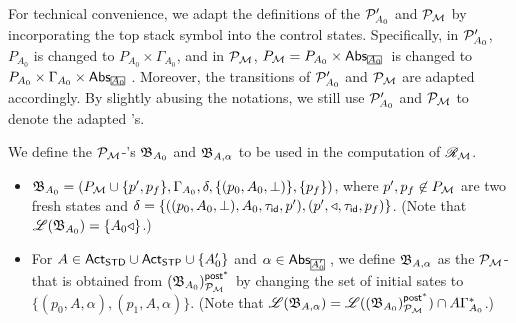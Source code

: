 For technical convenience, we adapt the definitions of the {\WOTrPDS} ${\mathcal{P} }'_{A_0}$ and ${\mathcal{P} }_{\mathcal{M} }$ by incorporating the top stack symbol into the control states. Specifically, in ${\mathcal{P} }'_{A_0}$, $P_{A_0}$ is changed to $P_{A_0} \times \Gamma_{A_0}$, and in ${\mathcal{P} }_{\mathcal{M} }$, $P_\Mm = P_{A_0} \times \abs_{\mhcancel{A_0}}$ is changed to $P_{A_0} \times \Gamma_{A_0} \times \abs_{\mhcancel{A_0}}$.  Moreover, the transitions of ${\mathcal{P} }'_{A_0}$ and ${\mathcal{P} }_{{\mathcal{M} }}$ are adapted accordingly. By slightly abusing the notations, we still use ${\mathcal{P} }'_{A_0}$ and ${\mathcal{P} }_{\mathcal{M} }$ to denote the adapted {\WOTrPDS}'s.

We define the ${\mathcal{P} }_{\mathcal{M} }$-{\WOTrNFA}'s ${\mathfrak{B} }_{A_0}$ and ${\mathfrak{B} }_{A, \alpha}$ to be used in the computation of $\mathscr{R}_{\mathcal{M} }$. 
\begin{itemize}
\item ${\mathfrak{B} }_{A_0} = (P_{\mathcal{M} } \cup \{p', p_f\}, \Gamma_{A_0}, \delta, \{(p_0, A_0, \bot)\}, \{p_f\})$, where $p', p_f \not \in P_{\mathcal{M} }$ are two fresh states and $\delta = \{((p_0, A_0, \bot), A_0, \tau_{\mathsf{id}}, p'), (p', \triangleleft, \tau_{\mathsf{id}}, p_f)\}$. (Note that ${\mathscr{L} }({\mathfrak{B} }_{A_0}) = \{A_0 \triangleleft\}$.)
%
\item For $A \in {\sf Act}_{\sf STD} \cup {\sf Act}_{\sf STP} \cup \{A'_0\}$ and $\alpha \in \abs_{\mhcancel{A'_0}}$, we define ${\mathfrak{B} }_{A, \alpha}$ as the ${\mathcal{P} }_{\mathcal{M} }$-{\WOTrNFA} that is obtained from $({\mathfrak{B} }_{A_0})^{{\mathsf{post} }^*}_{{\mathcal{P} }_{{\mathcal{M} }}}$ by changing the set of initial sates to $\{(p_0, A, \alpha), (p_1, A, \alpha)\}$. (Note that ${\mathscr{L} }({\mathfrak{B} }_{A, \alpha}) = {\mathscr{L} }(({\mathfrak{B} }_{A_0})^{{\mathsf{post} }^*}_{{\mathcal{P} }_{{\mathcal{M} }}}) \cap A \Gamma^*_{A_0}$.)
\end{itemize}

